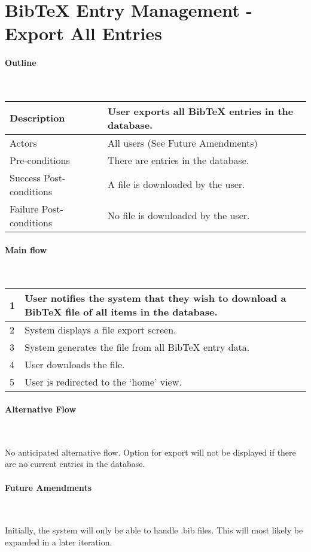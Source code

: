 \section*{BibTeX Entry Management - Export All Entries}

\paragraph*{Outline} \

\begin{tabular}{ | l | l | }
\hline
Description & User exports all BibTeX entries in the database. \\ \hline
Actors & All users (See  Future Amendments) \\ \hline
Pre-conditions & There are entries in the database. \\ \hline
Success Post-conditions & A file is downloaded by the user. \\ \hline
Failure Post-conditions & No file is downloaded by the user. \\ \hline
\end{tabular}


\paragraph*{Main flow} \

\begin{tabular}{ | l | l | } \hline
1 & User notifies the system that they wish to download a BibTeX file of all items in the database. \\ \hline
2 & System displays a file export screen. \\ \hline
3 & System generates the file from all BibTeX entry data. \\ \hline
4 & User downloads the file. \\ \hline
5 & User is redirected to the `home' view. \\ \hline
\end{tabular}


\paragraph*{Alternative Flow} \

No anticipated alternative flow.  Option for export will not be displayed if there are no current entries in the database.

\paragraph*{Future Amendments} \

Initially, the system will only be able to handle .bib files. This will most likely be expanded in a later iteration.

